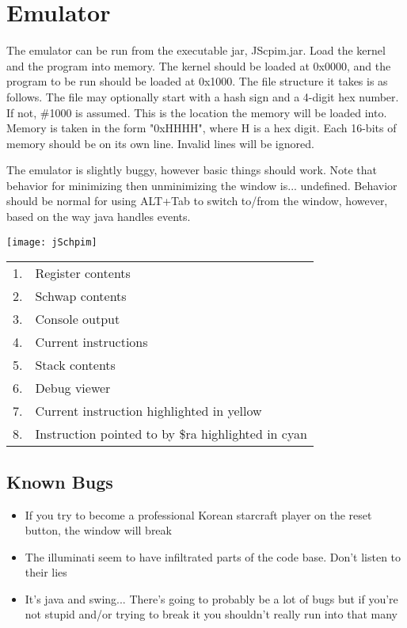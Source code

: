 \section{Emulator}
	The emulator can be run from the executable jar, JScpim.jar. Load the kernel and the program into memory. The kernel should be loaded at 0x0000, and the program to be run should be loaded at 0x1000.  The file structure it takes is as follows. The file may optionally start with a hash sign and a 4-digit hex number. If not, \#1000 is assumed. This is the location the memory will be loaded into.  Memory is taken in the form "0xHHHH", where H is a hex digit. Each 16-bits of memory should be on its own line. Invalid lines will be ignored.\par
	The emulator is slightly buggy, however basic things should work. Note that behavior for minimizing then unminimizing the window is... undefined. Behavior should be normal for using ALT+Tab to switch to/from the window, however, based on the way java handles events.\\
	\begin{center}\texttt{[image: jSchpim]}\end{center}
	\begin{tabular}{ r l }
		1. & Register contents \\
		2. & Schwap contents \\
		3. & Console output \\
		4. & Current instructions \\
		5. & Stack contents \\
		6. & Debug viewer \\
		7. & Current instruction highlighted in yellow \\
		8. & Instruction pointed to by \$ra highlighted in cyan \\
	\end{tabular}
	\subsection{Known Bugs}
		\begin{itemize}
			\item If you try to become a professional Korean starcraft player on the reset button, the window will break
			\item The illuminati seem to have infiltrated parts of the code base. Don't listen to their lies
			\item It's java and swing... There's going to probably be a lot of bugs but if you're not stupid and/or trying to break it you shouldn't really run into that many
		\end{itemize}
